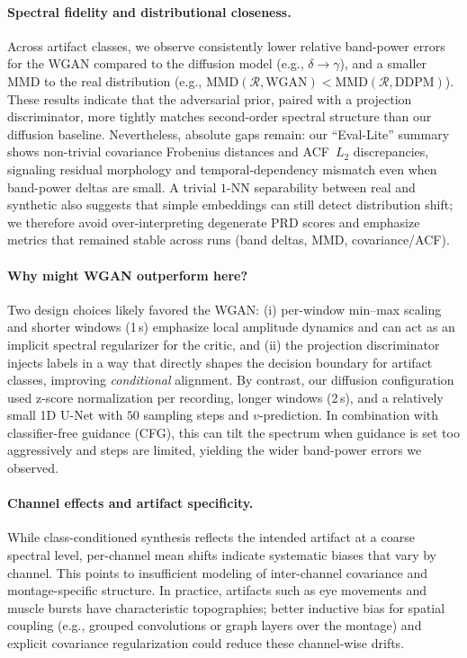 \documentclass{article}
\begin{document}
\paragraph{Spectral fidelity and distributional closeness.}
Across artifact classes, we observe consistently lower relative band-power errors for the WGAN compared to the diffusion model (e.g., $\delta\!\rightarrow\!\gamma$), and a smaller MMD to the real distribution (e.g., $\text{MMD}(\mathcal{R},\text{WGAN})<\text{MMD}(\mathcal{R},\text{DDPM})$). These results indicate that the adversarial prior, paired with a projection discriminator, more tightly matches second-order spectral structure than our diffusion baseline. Nevertheless, absolute gaps remain: our “Eval-Lite” summary shows non-trivial covariance Frobenius distances and ACF~$L_2$ discrepancies, signaling residual morphology and temporal-dependency mismatch even when band-power deltas are small. A trivial $1$-NN separability between real and synthetic also suggests that simple embeddings can still detect distribution shift; we therefore avoid over-interpreting degenerate PRD scores and emphasize metrics that remained stable across runs (band deltas, MMD, covariance/ACF).

\paragraph{Why might WGAN outperform here?}
Two design choices likely favored the WGAN: (i) per-window min–max scaling and shorter windows (1\,s) emphasize local amplitude dynamics and can act as an implicit spectral regularizer for the critic, and (ii) the projection discriminator injects labels in a way that directly shapes the decision boundary for artifact classes, improving \emph{conditional} alignment. By contrast, our diffusion configuration used z-score normalization per recording, longer windows (2\,s), and a relatively small 1D U-Net with $50$ sampling steps and $v$-prediction. In combination with classifier-free guidance (CFG), this can tilt the spectrum when guidance is set too aggressively and steps are limited, yielding the wider band-power errors we observed.

\paragraph{Channel effects and artifact specificity.}
While class-conditioned synthesis reflects the intended artifact at a coarse spectral level, per-channel mean shifts indicate systematic biases that vary by channel. This points to insufficient modeling of inter-channel covariance and montage-specific structure. In practice, artifacts such as eye movements and muscle bursts have characteristic topographies; better inductive bias for spatial coupling (e.g., grouped convolutions or graph layers over the montage) and explicit covariance regularization could reduce these channel-wise drifts.
\end{document}
